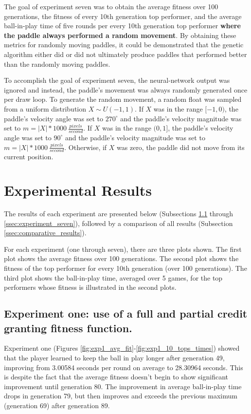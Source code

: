 The goal of experiment seven was to obtain the average fitness over 100 generations, the fitness of every 10th generation top performer, and the average ball-in-play time of five rounds per every 10th generation top performer \textbf{where the paddle always performed a random movement}. By obtaining these metrics for randomly moving paddles, it could be demonstrated that the genetic algorithm either did or did not ultimately produce paddles that performed better than the randomly moving paddles. 

To accomplish the goal of experiment seven, the neural-network output was ignored and instead, the paddle's movement was always randomly generated once per draw loop. To generate the random movement, a random float was sampled from a uniform distribution $X\sim U(-1,1)$. If $X$ was in the range $[-1,0)$, the paddle's velocity angle was set to $270^\circ$ and the paddle's velocity magnitude was set to $m = |X| * 1000 \ \frac{pixels}{second}$. If $X$ was in the range $(0,1]$, the paddle's velocity angle was set to $90^\circ$ and the paddle's velocity magnitude was set to $m = |X| * 1000 \ \frac{pixels}{second}$. Otherwise, if $X$ was zero, the paddle did not move from its current position.

\section{Experimental Results}

The results of each experiment are presented below (Subsections \ref{ssec:experiment_one}  through \ref{ssec:experiment_seven}), followed by a comparison of all results (Subsection \ref{ssec:comparative_results}).

For each experiment (one through seven), there are three plots shown. The first plot shows the average fitness over 100 generations. The second plot shows the fitness of the top performer for every 10th generation (over 100 generations). The third plot shows the ball-in-play time, averaged over 5 games, for the top performers whose fitness is illustrated in the second plots.

\subsection[Experiment One]{Experiment one: use of a full and partial credit granting fitness function.}
\label{ssec:experiment_one}

Experiment one (Figures \ref{fig:exp1_avg_fit}-\ref{fig:exp1_10_tops_times}) showed that the player learned to keep the ball in play longer after generation 49, improving from 3.00584 seconds per round on average to 28.30964 seconds. This is despite the fact that the average fitness doesn't begin to show significant improvement until generation 80. The improvement in average ball-in-play time drops in generation 79, but then improves and exceeds the previous maximum (generation 69) after generation 89.

